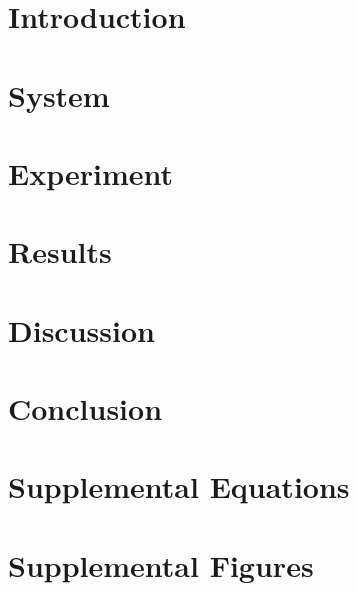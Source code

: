 \documentclass[review,3p,authoryear]{elsarticle}
\begin{document}

\clearpage
\section{Introduction}\label{s:intro}

\section{System}\label{s:system}

\clearpage
\section{Experiment}\label{s:exp}

\section{Results}\label{s:results}

\section{Discussion}\label{s:discussion}

\section{Conclusion}\label{s:conclusion}

\clearpage

\clearpage
\appendix\setcounter{figure}{0}
\section{Supplemental Equations}\label{a:eqs}

\clearpage
\section{Supplemental Figures}\label{a:figs}

\clearpage
\end{document}

